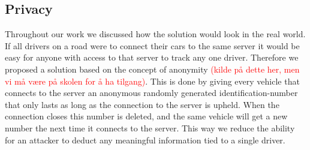 \subsection{Privacy}
Throughout our work we discussed how the solution would look in the real world. If all drivers on a road were to connect their cars to the same server it would be easy for anyone with access to that server to track any one driver. Therefore we proposed a solution based on the concept of anonymity \textcolor{red}{(kilde på dette her, men vi må være på skolen for å ha tilgang)}. This is done by giving every vehicle that connects to the server an anonymous randomly generated identification-number that only lasts as long as the connection to the server is upheld. When the connection closes this number is deleted, and the same vehicle will get a new number the next time it connects to the server. This way we reduce the ability for an attacker to deduct any meaningful information tied to a single driver. 